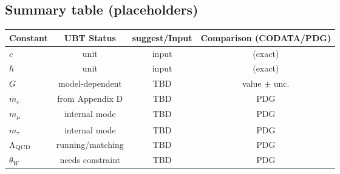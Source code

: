 \subsection{Summary table (placeholders)}
\begin{center}
\begin{tabular}{lccc}
\hline
Constant & UBT Status & suggest/Input & Comparison (CODATA/PDG)\\
\hline
$c$ & unit & input & (exact)\\
$\hbar$ & unit & input & (exact)\\
$G$ & model-dependent & TBD & value $\pm$ unc.\\
$m_e$ & from Appendix D & TBD & PDG\\
$m_\mu$ & internal mode & TBD & PDG\\
$m_\tau$ & internal mode & TBD & PDG\\
$\Lambda_{\rm QCD}$ & running/matching & TBD & PDG\\
$\theta_W$ & needs constraint & TBD & PDG\\
\hline
\end{tabular}
\end{center}
